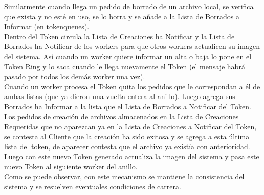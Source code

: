 \documentclass[12pt]{article}
\begin{document}
Similarmente cuando llega un pedido de borrado de un archivo local, se verifica que exista y no esté en uso, se lo borra y se añade a la Lista de Borrados a Informar (en tokenqueues).\\

Dentro del Token circula la Lista de Creaciones ha Notificar y la Lista de Borrados ha Notificar de los workers para que otros workers actualicen su imagen del sistema. Así cuando un worker quiere informar un alta o baja lo pone en el Token Ring y lo saca cuando le llega nuevamente el Token (el mensaje habrá pasado por todos los demás worker una vez).\\

Cuando un worker procesa el Token quita los pedidos que le correspondan a él de ambas listas (que ya dieron una vuelta entera al anillo). Luego agrega sus Borrados ha Informar a la lista que el Lista de Borrados a Notificar del Token. Los pedidos de creación de archivos almacenados en la Lista de Creaciones Requeridas que no aparezcan ya en la Lista de Creaciones a Notificar del Token, se contesta al Cliente que la creación ha sido exitosa y se agrega a esta última lista del token, de aparecer contesta que el archivo ya existía con anterioridad.\\

Luego con este nuevo Token generado actualiza la imagen del sistema y pasa este nuevo Token al siguiente worker del anillo.\\

Como se puede observar, con este mecanismo se mantiene la consistencia del sistema y se resuelven eventuales condiciones de carrera.
\end{document}
